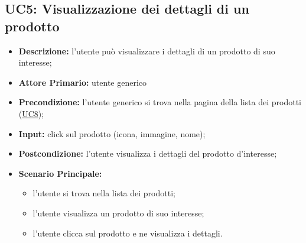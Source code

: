 \subsection{UC5: Visualizzazione dei dettagli di un prodotto}
\label{sec:UC5}
\begin{itemize}
    \item \textbf{Descrizione:} l'utente può visualizzare i dettagli di un prodotto di suo interesse;
    \item \textbf{Attore Primario:} utente generico
    \item \textbf{Precondizione:} l'utente generico si trova nella pagina della lista dei prodotti (\hyperref[sec:UC8]{\underline{UC8}});
    \item \textbf{Input:} click sul prodotto (icona, immagine, nome);
    \item \textbf{Postcondizione:} l'utente visualizza i dettagli del prodotto d'interesse;
    \item \textbf{Scenario Principale:}
          \begin{itemize}
              \item l'utente si trova nella lista dei prodotti;
              \item l'utente visualizza un prodotto di suo interesse;
              \item l'utente clicca sul prodotto e ne visualizza i dettagli.
          \end{itemize}
\end{itemize}